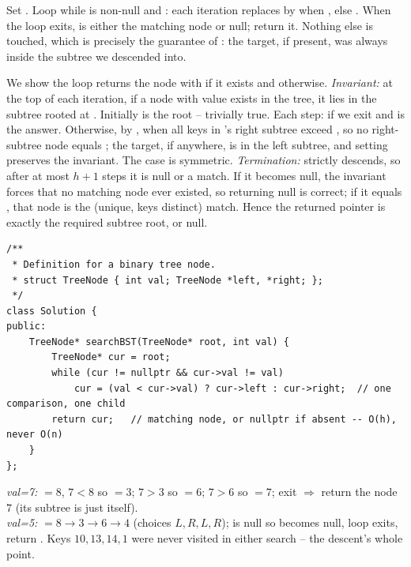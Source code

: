 Set . Loop while  is non-null and : each iteration
replaces  by  when , else . When the
loop exits,  is either the matching node or null; return it. Nothing else is touched, which
is precisely the guarantee of : the target, if present, was always inside the
subtree we descended into.

\begin{proofbox}
We show the loop returns the node with  if it exists and  otherwise.
\emph{Invariant:} at the top of each iteration, if a node with value  exists in the tree, it
lies in the subtree rooted at . Initially  is the root -- trivially true. Each
step: if  we exit and  is the answer. Otherwise, by ,
when  all keys in 's right subtree exceed , so no
right-subtree node equals ; the target, if anywhere, is in the left subtree, and setting
 preserves the invariant. The case  is symmetric.
\emph{Termination:}  strictly descends, so after at most $h+1$ steps it is null or a match.
If it becomes null, the invariant forces that no matching node ever existed, so returning null is
correct; if it equals , that node is the (unique, keys distinct) match. Hence the returned
pointer is exactly the required subtree root, or null. \end{proofbox}

\begin{lstlisting}[caption={Search in a BST -- the graded, submittable solution (LeetCode 700)}, label={lst:c05-search-soln}]
/**
 * Definition for a binary tree node.
 * struct TreeNode { int val; TreeNode *left, *right; };
 */
class Solution {
public:
    TreeNode* searchBST(TreeNode* root, int val) {
        TreeNode* cur = root;
        while (cur != nullptr && cur->val != val)
            cur = (val < cur->val) ? cur->left : cur->right;  // one comparison, one child
        return cur;   // matching node, or nullptr if absent -- O(h), never O(n)
    }
};
\end{lstlisting}

\begin{tracebox}
\emph{val=7:} $=8$, $7<8$ so $=3$; $7>3$ so $=6$; $7>6$ so
$=7$;  exit $\Rightarrow$ return the node $7$ (its subtree is just itself).
\checkmark\\
\emph{val=5:} $=8\to3\to6\to4$ (choices $L,R,L,R$);  is null so 
becomes null, loop exits, return . \checkmark Keys $10,13,14,1$ were never visited in
either search -- the descent's whole point.
\end{tracebox}

